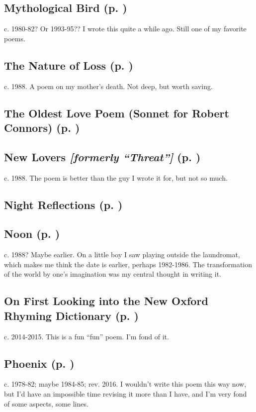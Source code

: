 \subsection*{Mythological Bird (p. \pageref{ch:mythological_bird})}
c. 1980-82? Or 1993-95?? I wrote this quite a while
ago. Still one of my favorite poems.

\subsection*{The Nature of Loss (p. \pageref{ch:the_nature_of_loss})}
c. 1988. A poem on my mother's death. Not deep, but worth
saving.

\subsection*{The Oldest Love Poem (Sonnet for Robert Connors) (p. \pageref{ch:the_oldest_love_poem})}

\subsection*{New Lovers \textit{[formerly ``Threat'']} (p. \pageref{ch:new_lovers})}
c. 1988. The poem is better than the guy I wrote it for,
but not so much.

\subsection*{Night Reflections (p. \pageref{ch:night_reflections})}
\subsection*{Noon (p. \pageref{ch:noon})}
c. 1988? Maybe earlier. On a little boy I saw playing
outside the laundromat, which makes me think the date is earlier,
perhaps 1982-1986. The transformation of the world by one's imagination
was my central thought in writing it.

\subsection*{On First Looking into the New Oxford Rhyming Dictionary (p. \pageref{ch:on_first_looking})}
c. 2014-2015. This is a fun ``fun'' poem. I'm fond of it.

\subsection*{Phoenix (p. \pageref{ch:phoenix})}
c. 1978-82; maybe 1984-85; rev. 2016. I wouldn't write
this poem this way now, but I'd have an impossible time revising it more
than I have, and I'm very fond of some aspects, some
lines.

